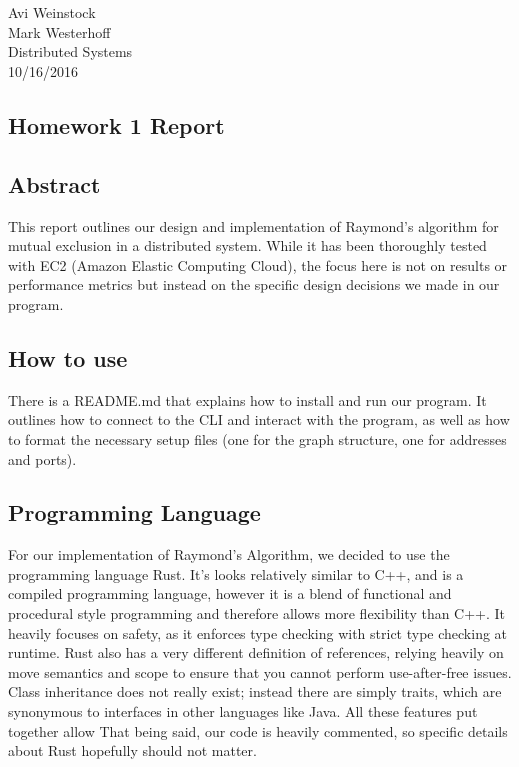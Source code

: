 \documentclass{article}
\begin{document}
\section*{}
Avi Weinstock \\
Mark Westerhoff \\
Distributed Systems\\
10/16/2016

\begin{center}
	\section*{Homework 1 Report}
\end{center}

\subsection*{Abstract}
This report outlines our design and implementation of Raymond's algorithm for mutual exclusion in a distributed system. While it has been thoroughly tested with EC2 (Amazon Elastic Computing Cloud), the focus here is not on results or performance metrics but instead on the specific design decisions we made in our program.

\subsection*{How to use}
There is a README.md that explains how to install and run our program. It outlines how to connect to the CLI and interact with the program, as well as how to format the necessary setup files (one for the graph structure, one for addresses and ports).

\subsection*{Programming Language}
For our implementation of Raymond's Algorithm, we decided to use the programming language Rust. It's looks relatively similar to C++, and is a compiled programming language, however it is a blend of functional and procedural style programming and therefore allows more flexibility than C++. It heavily focuses on safety, as it enforces type checking with strict type checking at runtime. Rust also has a very different definition of references, relying heavily on move semantics and scope to ensure that you cannot perform use-after-free issues. Class inheritance does not really exist; instead there are simply traits, which are synonymous to interfaces in other languages like Java. All these features put together allow That being said, our code is heavily commented, so specific details about Rust hopefully should not matter.
\end{document}
